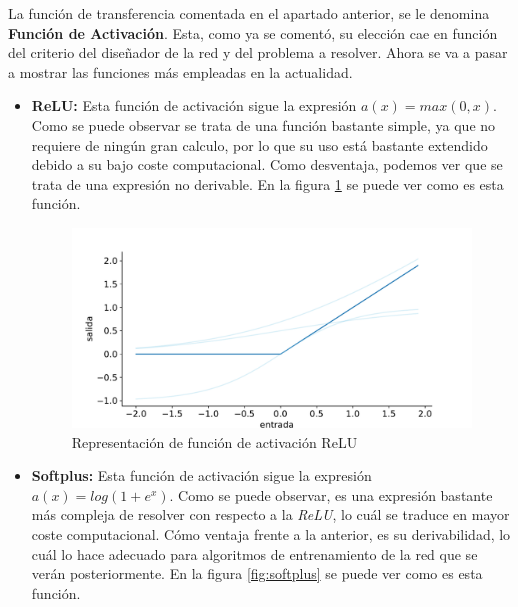 La función de transferencia comentada en el apartado anterior, se le denomina \textbf{Función de Activación}. Esta, como ya se comentó, su elección cae en función del criterio del diseñador de la red y del problema a resolver. Ahora se va a pasar a mostrar las funciones más empleadas en la actualidad.

\begin{itemize}
    \item \textbf{ReLU:} Esta función de activación sigue la expresión $a(x) = max(0,x)$. Como se puede observar se trata de una función bastante simple, ya que no requiere de ningún gran calculo, por lo que su uso está bastante extendido debido a su bajo coste computacional. Como desventaja, podemos ver que se trata de una expresión no derivable. En la figura \ref{fig:relu} se puede ver como es esta función.
    
    \begin{figure}[!ht]
    \centering
    \includegraphics[width=\textwidth]{figuras/desarrollo teorico/relu.pdf}
    \caption{Representación de función de activación ReLU}
    \label{fig:relu}
    \end{figure}

    
    \item \textbf{Softplus:} Esta función de activación sigue la expresión $a(x) = log(1 + e^x)$. Como se puede observar, es una expresión bastante más compleja de resolver con respecto a la \textit{ReLU}, lo cuál se traduce en mayor coste computacional. Cómo ventaja frente a la anterior, es su derivabilidad, lo cuál lo hace adecuado para algoritmos de entrenamiento de la red que se verán posteriormente. En la figura \ref{fig:softplus} se puede ver como es esta función.
    

\end{itemize}
